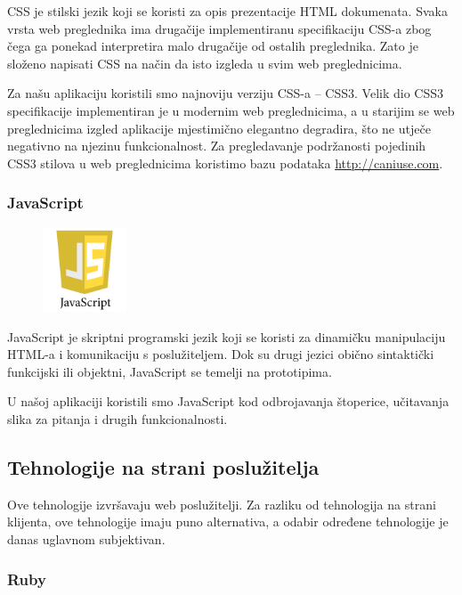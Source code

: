 \documentclass[11pt]{scrreprt}
\begin{document}
CSS je stilski jezik koji se koristi za opis prezentacije HTML dokumenata. Svaka
vrsta web preglednika ima drugačije implementiranu specifikaciju CSS-a zbog čega
ga ponekad interpretira malo drugačije od ostalih preglednika. Zato je složeno
napisati CSS na način da isto izgleda u svim web preglednicima.\cite{htmlncss}

Za našu aplikaciju koristili smo najnoviju verziju CSS-a -- CSS3. Velik dio CSS3
specifikacije implementiran je u modernim web preglednicima, a u starijim se web
preglednicima izgled aplikacije mjestimično elegantno degradira, što ne utječe
negativno na njezinu funkcionalnost. Za pregledavanje podržanosti pojedinih CSS3
stilova u web preglednicima koristimo bazu podataka \url{http://caniuse.com}.

\subsubsection{JavaScript}

\begin{figure}
  \vspace{-10pt}
  \includegraphics[width=2.5cm]{logos/javascript}
  \vspace{-30pt}
\end{figure}

JavaScript je skriptni programski jezik koji se koristi za dinamičku
manipulaciju HTML-a i komunikaciju s poslužiteljem. Dok su drugi jezici obično
sintaktički funkcijski ili objektni, JavaScript se temelji na
prototipima.\cite{js,effectivejs}

U našoj aplikaciji koristili smo JavaScript kod odbrojavanja štoperice,
učitavanja slika za pitanja i drugih funkcionalnosti.

\subsection{Tehnologije na strani poslužitelja}

Ove tehnologije izvršavaju web poslužitelji. Za razliku od tehnologija na
strani klijenta, ove tehnologije imaju puno alternativa, a odabir određene
tehnologije je danas uglavnom subjektivan.

\subsubsection{Ruby}
\end{document}

